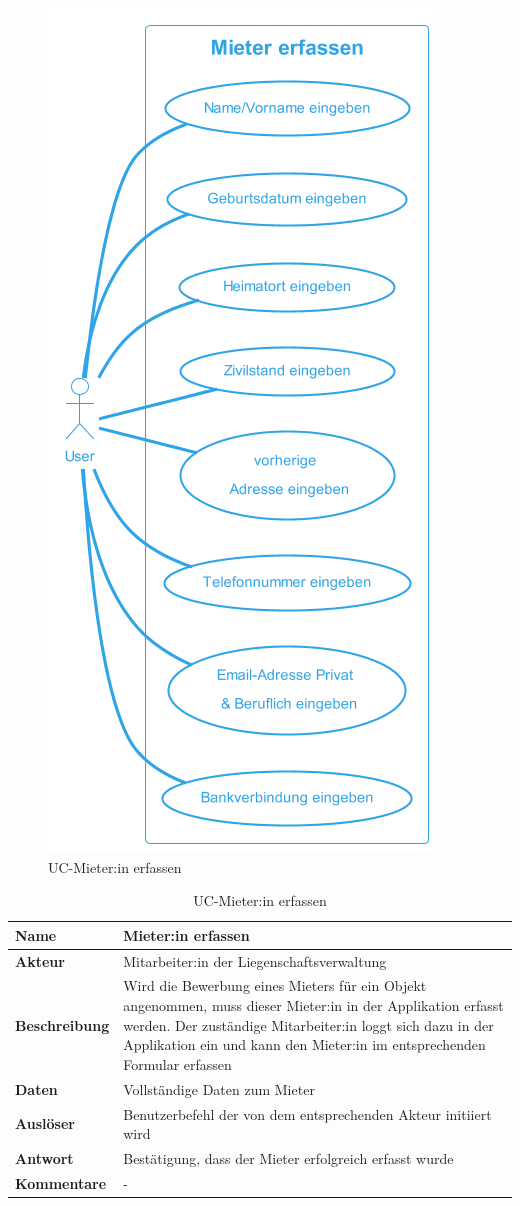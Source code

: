 \begin{figure}[H]
  \begin{center}
    \includegraphics[width=0.4\linewidth]{content/diagrams/out/usecase/mieterErfassen/Mieter erfassen.png}
    \caption{UC-Mieter:in erfassen}
    \label{mieterErfassen}
  \end{center}
\end{figure}

\begin{table}[H]
  \centering
  \settowidth{}
  \setlength\extrarowheight{2pt}
  \begin{tabulary}{1.0\textwidth}{|a|m{14cm}|}
    \hline
    \textbf{Name}& Mieter:in erfassen\\
    \hline
    \textbf{Akteur}& Mitarbeiter:in der Liegenschaftsverwaltung\\
    \hline 
    \textbf{Beschreibung} & Wird die Bewerbung eines Mieters für ein Objekt angenommen, muss dieser Mieter:in in der Applikation erfasst werden. Der zuständige Mitarbeiter:in loggt sich dazu in der Applikation ein und kann den Mieter:in im entsprechenden Formular erfassen\\
    \hline
    \textbf{Daten} & Vollständige Daten zum Mieter\\
    \hline
    \textbf{Auslöser} & Benutzerbefehl der von dem entsprechenden Akteur initiiert wird\\
    \hline
    \textbf{Antwort} & Bestätigung, dass der Mieter erfolgreich erfasst wurde\\
    \hline
    \textbf{Kommentare} & -\\
    \hline
  \end{tabulary}
  \caption{UC-Mieter:in erfassen}
\end{table}
